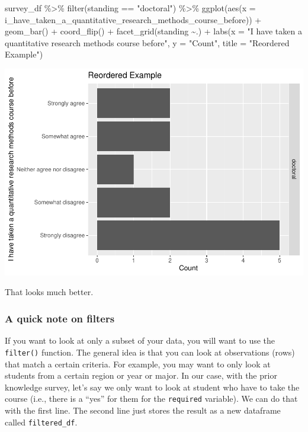 \documentclass[
]{book}
\newenvironment{Shaded}{\begin{snugshade}}{\end{snugshade}}
\newcommand{\AttributeTok}[1]{\textcolor[rgb]{0.77,0.63,0.00}{#1}}
\newcommand{\FunctionTok}[1]{\textcolor[rgb]{0.00,0.00,0.00}{#1}}
\newcommand{\NormalTok}[1]{#1}
\newcommand{\SpecialCharTok}[1]{\textcolor[rgb]{0.00,0.00,0.00}{#1}}
\newcommand{\StringTok}[1]{\textcolor[rgb]{0.31,0.60,0.02}{#1}}
\begin{document}
\begin{Shaded}
\begin{Highlighting}[]
\NormalTok{survey\_df }\SpecialCharTok{\%\textgreater{}\%} 
  \FunctionTok{filter}\NormalTok{(standing }\SpecialCharTok{==} \StringTok{"doctoral"}\NormalTok{) }\SpecialCharTok{\%\textgreater{}\%}
  \FunctionTok{ggplot}\NormalTok{(}\FunctionTok{aes}\NormalTok{(}\AttributeTok{x =}\NormalTok{ i\_have\_taken\_a\_quantitative\_research\_methods\_course\_before)) }\SpecialCharTok{+}
  \FunctionTok{geom\_bar}\NormalTok{() }\SpecialCharTok{+}
  \FunctionTok{coord\_flip}\NormalTok{() }\SpecialCharTok{+}
  \FunctionTok{facet\_grid}\NormalTok{(standing }\SpecialCharTok{\textasciitilde{}}\NormalTok{.) }\SpecialCharTok{+}
  \FunctionTok{labs}\NormalTok{(}\AttributeTok{x =} \StringTok{"I have taken a quantitative research methods course before"}\NormalTok{,}
       \AttributeTok{y =} \StringTok{"Count"}\NormalTok{,}
       \AttributeTok{title =} \StringTok{"Reordered Example"}\NormalTok{)}
\end{Highlighting}
\end{Shaded}

\includegraphics{test_course_notes_files/figure-latex/unnamed-chunk-36-1.pdf}

That looks much better.

\hypertarget{a-quick-note-on-filters}{%
\subsubsection*{A quick note on filters}\label{a-quick-note-on-filters}}

If you want to look at only a subset of your data, you will want to use the \texttt{filter()} function. The general idea is that you can look at observations (rows) that match a certain criteria. For example, you may want to only look at students from a certain region or year or major. In our case, with the prior knowledge survey, let's say we only want to look at student who have to take the course (i.e., there is a ``yes'' for them for the \texttt{required} variable). We can do that with the first line. The second line just stores the result as a new dataframe called \texttt{filtered\_df}.
\end{document}
